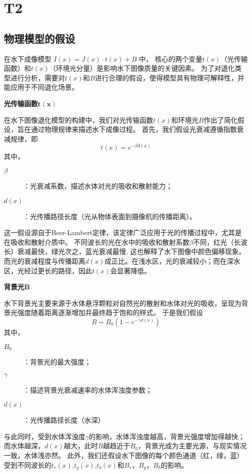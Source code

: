 \documentclass[11pt]{ctexart}
\begin{document}
    \section{T2}
    
    \subsection{物理模型的假设}
在水下成像模型 $I(x) = J(x) \cdot t(x) + B$ 中，
核心的两个变量$t(x)$（光传输函数）和$t(x)$（环境光分量）是影响水下图像质量的关键因素。
为了对退化类型进行分析，需要对$t(x)$和$B$进行合理的假设，使得模型具有物理可解释性，并能应用于不同退化场景。


    \textbf{光传输函数}$\boldsymbol{t(x)}$


    在水下图像退化模型的构建中，我们对光传输函数$t(x)$和环境光$B$作出了简化假设，旨在通过物理规律来描述水下成像过程。
    首先，我们假设光衰减遵循指数衰减规律，即\[t(x)=e^{-\beta d(x)}\]
    其中，
    \begin{description}
        \item[$\beta$]：光衰减系数，描述水体对光的吸收和散射能力；
        \item[$d(x)$]：光传播路径长度（光从物体表面到摄像机的传播距离）。
    \end{description}
    这一假设源自于Beer-Lambert定律，该定律广泛应用于光的传播过程中，尤其是在吸收和散射介质中。
    不同波长的光在水中的吸收和散射系数$\beta $不同，红光（长波长）衰减最快，绿光次之，蓝光衰减最慢,
    这也解释了水下图像中颜色偏移现象。
    而光的衰减程度与传播距离$d(x)$成正比。在浅水区，光的衰减较小；而在深水区，光经过更长的路径，因此$t(x)$会显著降低。


    \textbf{背景光}$\boldsymbol{B}$


    水下背景光主要来源于水体悬浮颗粒对自然光的散射和水体对光的吸收，呈现为背景光强度随着距离逐渐增加并最终趋于饱和的样式。
    于是我们假设\[B=B_0(1-e^{-\gamma d(x)})\]
    其中，
    \begin{description}
        \item [$B_0$]：背景光的最大强度；
        \item [$\gamma$]：描述背景光衰减速率的水体浑浊度参数；
        \item [$d(x)$]：光传播路径长度（水深）
    \end{description}
    与此同时，受到水体浑浊度$\gamma $的影响，水体浑浊度越高，背景光强度增加得越快；
    而水体越深，$d(x)$越大，此时$B$越趋近于$B_0$，背景光成为主要光源，与现实情况一致，水体浅亦然。
    此外，我们还假设水下图像的每个颜色通道（红，绿，蓝）受到不同波长的$t_{r} (x)$,$t_{g} (x)$,$t_{b} (x)$和$B_r$，$B_g$，$B_b$的影响。
\end{document}
